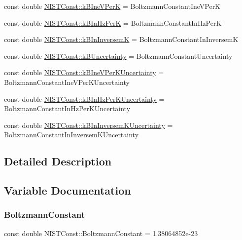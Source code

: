 \begin{DoxyCompactItemize}
\item 
const double \hyperlink{group___n_i_s_t_const-_boltzmann_constant_gae6941828181b77b14f5f24a8b713570f}{N\+I\+S\+T\+Const\+::k\+B\+Ine\+V\+PerK} = Boltzmann\+Constant\+Ine\+V\+PerK
\item 
const double \hyperlink{group___n_i_s_t_const-_boltzmann_constant_gaa7a3aa5798c9617d09120f8041c93433}{N\+I\+S\+T\+Const\+::k\+B\+In\+Hz\+PerK} = Boltzmann\+Constant\+In\+Hz\+PerK
\item 
const double \hyperlink{group___n_i_s_t_const-_boltzmann_constant_ga54bf445c848dc6dc425076bf6ab45d83}{N\+I\+S\+T\+Const\+::k\+B\+In\+InversemK} = Boltzmann\+Constant\+In\+InversemK
\item 
const double \hyperlink{group___n_i_s_t_const-_boltzmann_constant_ga60fef44440e26486ae70903ff601a8e5}{N\+I\+S\+T\+Const\+::k\+B\+Uncertainty} = Boltzmann\+Constant\+Uncertainty
\item 
const double \hyperlink{group___n_i_s_t_const-_boltzmann_constant_gaf7b77bfffef71941035ce9d3164c94ab}{N\+I\+S\+T\+Const\+::k\+B\+Ine\+V\+Per\+K\+Uncertainty} = Boltzmann\+Constant\+Ine\+V\+Per\+K\+Uncertainty
\item 
const double \hyperlink{group___n_i_s_t_const-_boltzmann_constant_gacee490b0a8b778a3a5f381be776f493e}{N\+I\+S\+T\+Const\+::k\+B\+In\+Hz\+Per\+K\+Uncertainty} = Boltzmann\+Constant\+In\+Hz\+Per\+K\+Uncertainty
\item 
const double \hyperlink{group___n_i_s_t_const-_boltzmann_constant_gafb5daa855b569ec25364ad61ecea9b2a}{N\+I\+S\+T\+Const\+::k\+B\+In\+Inversem\+K\+Uncertainty} = Boltzmann\+Constant\+In\+Inversem\+K\+Uncertainty
\end{DoxyCompactItemize}


\subsection{Detailed Description}


\subsection{Variable Documentation}
\mbox{\label{group___n_i_s_t_const-_boltzmann_constant_ga505057a2eb7e925fde668cc1025331df}} 
\subsubsection{\texorpdfstring{Boltzmann\+Constant}{BoltzmannConstant}}
{\footnotesize\ttfamily const double N\+I\+S\+T\+Const\+::\+Boltzmann\+Constant = 1.\+38064852e-\/23}

